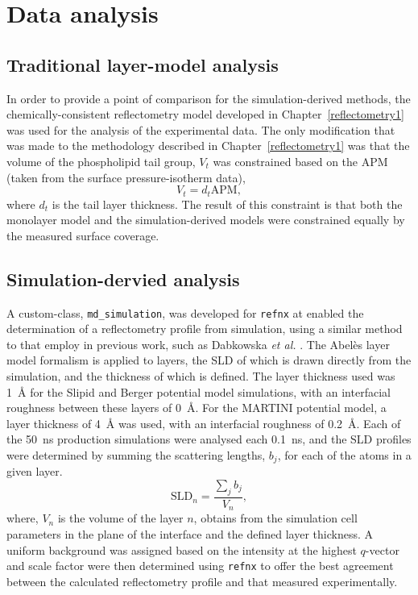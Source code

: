\section{Data analysis}
\subsection{Traditional layer-model analysis}
In order to provide a point of comparison for the simulation-derived methods, the chemically-consistent reflectometry model developed in Chapter~\ref{reflectometry1} was used for the analysis of the experimental data.
The only modification that was made to the methodology described in Chapter~\ref{reflectometry1} was that the volume of the phospholipid tail group, $V_t$ was constrained based on the APM (taken from the surface pressure-isotherm data),
%
\begin{equation}
V_t = d_t\text{APM},
\end{equation}
%
where $d_t$ is the tail layer thickness. The result of this constraint is that both the monolayer model and the simulation-derived models were constrained equally by the measured surface coverage.

\subsection{Simulation-dervied analysis}
A custom-class, \texttt{md\_simulation}, was developed for \texttt{refnx} \cite{nelson_refnx_2019,nelson_refnx_2019-1} at enabled the determination of a reflectometry profile from simulation, using a similar method to that employ in previous work, such as Dabkowska \emph{et al.} \cite{dabkowska_modulation_2014}.
The Abel\`{e}s layer model formalism is applied to layers, the SLD of which is drawn directly from the simulation, and the thickness of which is defined.
The layer thickness used was \SI{1}{\angstrom} for the Slipid and Berger potential model simulations, with an interfacial roughness between these layers of \SI{0}{\angstrom}.
For the MARTINI potential model, a layer thickness of \SI{4}{\angstrom} was used, with an interfacial roughness of \SI{0.2}{\angstrom}. Each of the \SI{50}{\nano\second} production simulations were analysed each \SI{0.1}{\nano\second}, and the SLD profiles were determined by summing the scattering lengths, $b_j$, for each of the atoms in a given layer.
%
\begin{equation}
\text{SLD}_n = \frac{\sum_j b_j}{V_n},
\end{equation}
%
where, $V_n$ is the volume of the layer $n$, obtains from the simulation cell parameters in the plane of the interface and the defined layer thickness.
A uniform background was assigned based on the intensity at the highest $q$-vector and scale factor were then determined using \texttt{refnx} to offer the best agreement between the calculated reflectometry profile and that measured experimentally.

